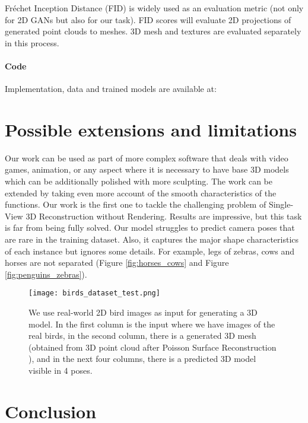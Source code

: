 \documentclass[runningheads]{llncs}
\begin{document}
Fréchet Inception Distance (FID) is widely used as an evaluation metric \cite{heusel2018gans} (not only for 2D GANs but also for our task). FID scores will evaluate 2D projections of generated point clouds to meshes. 3D mesh and textures are evaluated separately in this process.

\paragraph{Code}
Implementation, data and trained models are available at:\\ \textcolor{blue}{}

\section{Possible extensions and limitations}
Our work can be used as part of more complex software that deals with video games, animation, or any aspect where it is necessary to have base 3D models which can be additionally polished with more sculpting. The work can be extended by taking even more account of the smooth characteristics of the functions. Our work is the first one to tackle the challenging problem of Single-View 3D Reconstruction without Rendering. Results are impressive, but this task is far from being fully solved. Our model struggles to predict camera poses that are rare in the training dataset. Also, it captures the major shape characteristics of each instance but ignores some details. For example, legs of zebras, cows and horses are not separated (Figure \ref{fig:horses_cows} and Figure \ref{fig:penguins_zebras}).

\FloatBarrier

\begin{figure*}[hbt!]
\centering
\setlength{\abovecaptionskip}{3pt}
 \texttt{[image: birds\_dataset\_test.png]}
 \caption{We use real-world 2D bird images as input for generating a 3D model. In the first column is the input where we have images of the real birds, in the second column, there is a generated 3D mesh (obtained from 3D point cloud after Poisson Surface Reconstruction \cite{10.5555/1281957.1281965}), and in the next four columns, there is a predicted 3D model visible in 4 poses.} 
\label{fig:birds_dataset_test}
\end{figure*}

\FloatBarrier

\section{Conclusion}
\end{document}

